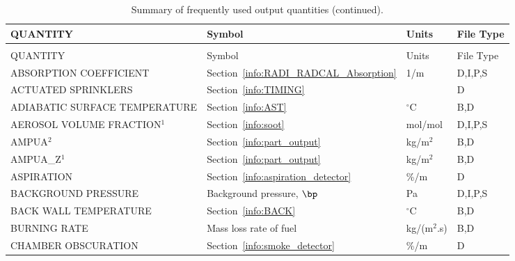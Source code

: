\documentclass[11pt]{book}
\begin{document}
\begin{longtable}{@{\extracolsep{\fill}}|l|l|l|l|}
\caption[Frequently used output quantities]{Summary of frequently used output quantities.}
\label{tab:output} \\
\hline
{\ct QUANTITY}                           & Symbol                                        & Units          & File Type    \\
\hline \hline
\endfirsthead
\caption[]{Summary of frequently used output quantities (continued).} \\
\hline
{\ct QUANTITY}                           & Symbol                                        & Units          & File Type    \\
\hline \hline
\endhead
{\ct ABSORPTION COEFFICIENT}                    & Section~\ref{info:RADI_RADCAL_Absorption}     & 1/m            & D,I,P,S      \\ \hline
{\ct ACTUATED SPRINKLERS}                       & Section~\ref{info:TIMING}                     &                & D            \\ \hline
{\ct ADIABATIC SURFACE TEMPERATURE}             & Section~\ref{info:AST}                        & $^\circ$C      & B,D          \\ \hline
{\ct AEROSOL VOLUME FRACTION}$^1$               & Section~\ref{info:soot}                       & mol/mol        & D,I,P,S      \\ \hline
{\ct AMPUA}$^2$                                 & Section~\ref{info:part_output}                & kg/m$^2$       & B,D          \\ \hline
{\ct AMPUA\_Z}$^1$                              & Section~\ref{info:part_output}                & kg/m$^2$       & B,D          \\ \hline
{\ct ASPIRATION}                                & Section~\ref{info:aspiration_detector}        & \%/m           & D            \\ \hline
{\ct BACKGROUND PRESSURE}                       & Background pressure, $\bp$                    & Pa             & D,I,P,S      \\ \hline
{\ct BACK WALL TEMPERATURE}                     & Section~\ref{info:BACK}                       & $^\circ$C      & B,D          \\ \hline
{\ct BURNING RATE}                              & Mass loss rate of fuel                        & \si{kg/(m$^2$.s)} & B,D       \\ \hline
{\ct CHAMBER OBSCURATION}                       & Section~\ref{info:smoke_detector}             & \%/m           & D            \\ \hline

\end{longtable}
\end{document}
